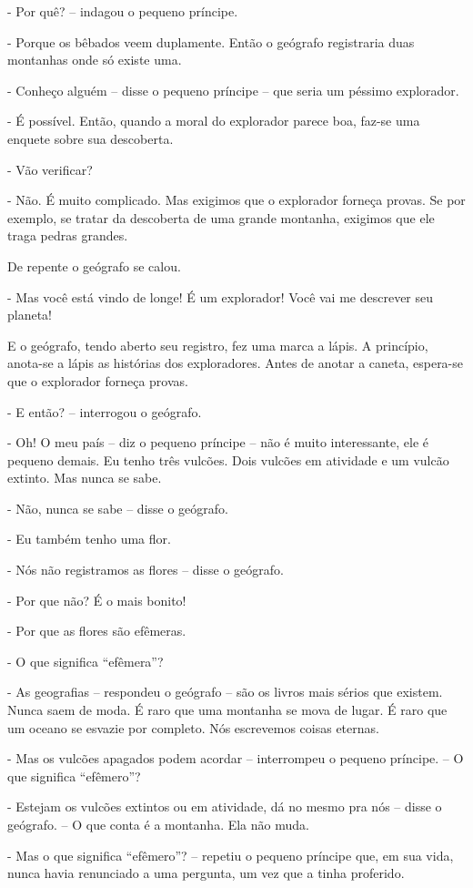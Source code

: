 - Por quê? -- indagou o pequeno príncipe.

- Porque os bêbados veem duplamente. Então o geógrafo registraria duas
montanhas onde só existe uma.

- Conheço alguém -- disse o pequeno príncipe -- que seria um péssimo
explorador.

- É possível. Então, quando a moral do explorador parece boa, faz-se uma
enquete sobre sua descoberta.

- Vão verificar?

- Não. É muito complicado. Mas exigimos que o explorador forneça provas.
Se por exemplo, se tratar da descoberta de uma grande montanha, exigimos
que ele traga pedras grandes.

De repente o geógrafo se calou.

- Mas você está vindo de longe! É um explorador! Você vai me descrever
seu planeta!

E o geógrafo, tendo aberto seu registro, fez uma marca a lápis. A
princípio, anota-se a lápis as histórias dos exploradores. Antes de
anotar a caneta, espera-se que o explorador forneça provas.

- E então? -- interrogou o geógrafo.

- Oh! O meu país -- diz o pequeno príncipe -- não é muito interessante,
ele é pequeno demais. Eu tenho três vulcões. Dois vulcões em atividade e
um vulcão extinto. Mas nunca se sabe.

- Não, nunca se sabe -- disse o geógrafo.

- Eu também tenho uma flor.

- Nós não registramos as flores -- disse o geógrafo.

- Por que não? É o mais bonito!

- Por que as flores são efêmeras.

- O que significa ``efêmera''?

- As geografias -- respondeu o geógrafo -- são os livros mais sérios que
existem. Nunca saem de moda. É raro que uma montanha se mova de lugar. É
raro que um oceano se esvazie por completo. Nós escrevemos coisas
eternas.

- Mas os vulcões apagados podem acordar -- interrompeu o pequeno
príncipe. -- O que significa ``efêmero''?

- Estejam os vulcões extintos ou em atividade, dá no mesmo pra nós --
disse o geógrafo. -- O que conta é a montanha. Ela não muda.

- Mas o que significa ``efêmero''? -- repetiu o pequeno príncipe que, em
sua vida, nunca havia renunciado a uma pergunta, um vez que a tinha
proferido.

